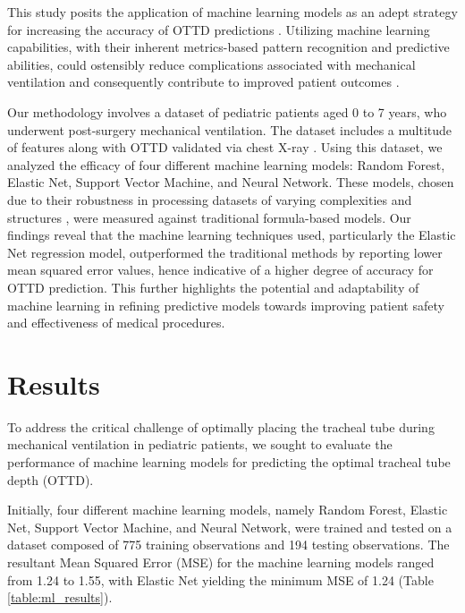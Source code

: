 \documentclass[11pt]{article}
\begin{document}
This study posits the application of machine learning models as an adept strategy for increasing the accuracy of OTTD predictions \cite{Naimi2021SpatialPO}. Utilizing machine learning capabilities, with their inherent metrics-based pattern recognition and predictive abilities, could ostensibly reduce complications associated with mechanical ventilation and consequently contribute to improved patient outcomes \cite{Lee2017EffectsOM}.

Our methodology involves a dataset of pediatric patients aged 0 to 7 years, who underwent post-surgery mechanical ventilation. The dataset includes a multitude of features along with OTTD validated via chest X-ray \cite{Carvalho1999ComparisonBT}. Using this dataset, we analyzed the efficacy of four different machine learning models: Random Forest, Elastic Net, Support Vector Machine, and Neural Network. These models, chosen due to their robustness in processing datasets of varying complexities and structures \cite{Naimi2021SpatialPO}, were measured against traditional formula-based models. Our findings reveal that the machine learning techniques used, particularly the Elastic Net regression model, outperformed the traditional methods by reporting lower mean squared error values, hence indicative of a higher degree of accuracy for OTTD prediction. This further highlights the potential and adaptability of machine learning in refining predictive models towards improving patient safety and effectiveness of medical procedures.

\section*{Results}

To address the critical challenge of optimally placing the tracheal tube during mechanical ventilation in pediatric patients, we sought to evaluate the performance of machine learning models for predicting the optimal tracheal tube depth (OTTD). 

Initially, four different machine learning models, namely Random Forest, Elastic Net, Support Vector Machine, and Neural Network, were trained and tested on a dataset composed of 775 training observations and 194 testing observations. The resultant Mean Squared Error (MSE) for the machine learning models ranged from 1.24 to 1.55, with Elastic Net yielding the minimum MSE of 1.24 (Table {}\ref{table:ml_results}).
\end{document}

